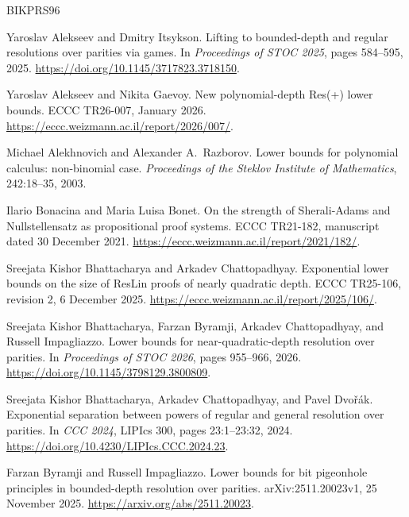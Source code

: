 \begin{thebibliography}{BIKPRS96}

Yaroslav Alekseev and Dmitry Itsykson.
\newblock Lifting to bounded-depth and regular resolutions over parities via games.
\newblock In \emph{Proceedings of STOC 2025}, pages 584--595, 2025.
\newblock \url{https://doi.org/10.1145/3717823.3718150}.

Yaroslav Alekseev and Nikita Gaevoy.
\newblock New polynomial-depth Res(+) lower bounds.
\newblock ECCC TR26-007, January 2026.
\newblock \url{https://eccc.weizmann.ac.il/report/2026/007/}.

Michael Alekhnovich and Alexander A.~Razborov.
\newblock Lower bounds for polynomial calculus: non-binomial case.
\newblock \emph{Proceedings of the Steklov Institute of Mathematics},
242:18--35, 2003.

Ilario Bonacina and Maria Luisa Bonet.
\newblock On the strength of Sherali-Adams and Nullstellensatz as
propositional proof systems.
\newblock ECCC TR21-182, manuscript dated 30 December 2021.
\newblock \url{https://eccc.weizmann.ac.il/report/2021/182/}.

Sreejata Kishor Bhattacharya and Arkadev Chattopadhyay.
\newblock Exponential lower bounds on the size of ResLin proofs of nearly
quadratic depth.
\newblock ECCC TR25-106, revision 2, 6 December 2025.
\newblock \url{https://eccc.weizmann.ac.il/report/2025/106/}.

Sreejata Kishor Bhattacharya, Farzan Byramji, Arkadev Chattopadhyay,
and Russell Impagliazzo.
\newblock Lower bounds for near-quadratic-depth resolution over parities.
\newblock In \emph{Proceedings of STOC 2026}, pages 955--966, 2026.
\newblock \url{https://doi.org/10.1145/3798129.3800809}.

Sreejata Kishor Bhattacharya, Arkadev Chattopadhyay, and Pavel Dvo\v{r}\'ak.
\newblock Exponential separation between powers of regular and general
resolution over parities.
\newblock In \emph{CCC 2024}, LIPIcs 300, pages 23:1--23:32, 2024.
\newblock \url{https://doi.org/10.4230/LIPIcs.CCC.2024.23}.

Farzan Byramji and Russell Impagliazzo.
\newblock Lower bounds for bit pigeonhole principles in bounded-depth
resolution over parities.
\newblock arXiv:2511.20023v1, 25 November 2025.
\newblock \url{https://arxiv.org/abs/2511.20023}.


\end{thebibliography}
